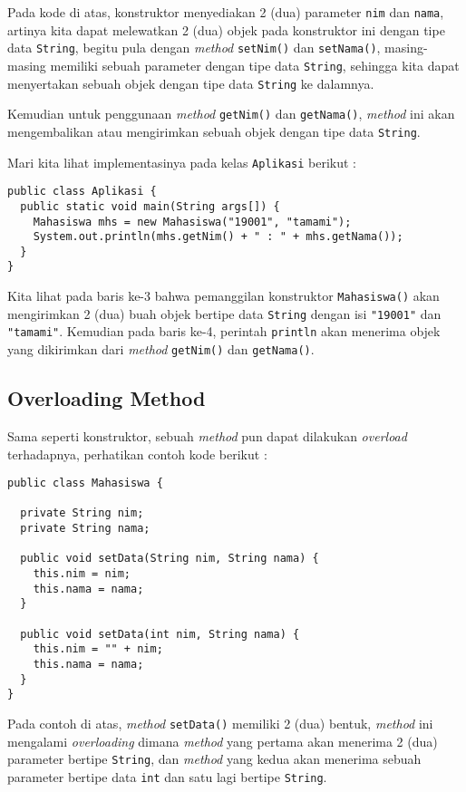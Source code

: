 Pada kode di atas, konstruktor menyediakan 2 (dua) parameter \texttt{nim} dan \texttt{nama}, artinya kita dapat melewatkan 2 (dua) objek pada konstruktor ini dengan tipe data \texttt{String}, begitu pula dengan \textit{method} \texttt{setNim()} dan \texttt{setNama()}, masing-masing memiliki sebuah parameter dengan tipe data \texttt{String}, sehingga kita dapat menyertakan sebuah objek dengan tipe data \texttt{String} ke dalamnya.

Kemudian untuk penggunaan \textit{method} \texttt{getNim()} dan \texttt{getNama()}, \textit{method} ini akan mengembalikan atau mengirimkan sebuah objek dengan tipe data \texttt{String}.

Mari kita lihat implementasinya pada kelas \texttt{Aplikasi} berikut :

\begin{lstlisting}
public class Aplikasi {
  public static void main(String args[]) {
    Mahasiswa mhs = new Mahasiswa("19001", "tamami");
    System.out.println(mhs.getNim() + " : " + mhs.getNama());
  }
}
\end{lstlisting}

Kita lihat pada baris ke-3 bahwa pemanggilan konstruktor \texttt{Mahasiswa()} akan mengirimkan 2 (dua) buah objek bertipe data \texttt{String} dengan isi \texttt{"19001"} dan \texttt{"tamami"}. Kemudian pada baris ke-4, perintah \texttt{println} akan menerima objek yang dikirimkan dari \textit{method} \texttt{getNim()} dan \texttt{getNama()}.

\subsection{Overloading Method}

Sama seperti konstruktor, sebuah \textit{method} pun dapat dilakukan \textit{overload} terhadapnya, perhatikan contoh kode berikut :

\begin{lstlisting}
public class Mahasiswa {

  private String nim;
  private String nama;
  
  public void setData(String nim, String nama) {
    this.nim = nim;
    this.nama = nama;
  }

  public void setData(int nim, String nama) {
    this.nim = "" + nim;
    this.nama = nama;
  }
}
\end{lstlisting}

Pada contoh di atas, \textit{method} \texttt{setData()} memiliki 2 (dua) bentuk, \textit{method} ini mengalami \textit{overloading} dimana \textit{method} yang pertama akan menerima 2 (dua) parameter bertipe \texttt{String}, dan \textit{method} yang kedua akan menerima sebuah parameter bertipe data \texttt{int} dan satu lagi bertipe \texttt{String}.

